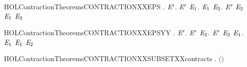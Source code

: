 \begin{SaveVerbatim}{HOLContractionTheoremsCONTRACTIONXXEPS}
\HOLTokenTurnstile{} \HOLSymConst{\HOLTokenForall{}}.
       \HOLSymConst{\HOLTokenImp{}}
     \HOLSymConst{\HOLTokenForall{}} \ensuremath{\HOLBoundVar{E}\sp{\prime{}}}.
         \ensuremath{\HOLBoundVar{E}\sp{\prime{}}} \HOLSymConst{\HOLTokenImp{}} \HOLSymConst{\HOLTokenForall{}}\ensuremath{\HOLBoundVar{E}\sb{\mathrm{1}}}.   \ensuremath{\HOLBoundVar{E}\sb{\mathrm{1}}} \HOLSymConst{\HOLTokenImp{}} \HOLSymConst{\HOLTokenExists{}}\ensuremath{\HOLBoundVar{E}\sb{\mathrm{2}}}.  \ensuremath{\HOLBoundVar{E}\sp{\prime{}}} \ensuremath{\HOLBoundVar{E}\sb{\mathrm{2}}} \HOLSymConst{\HOLTokenConj{}}  \ensuremath{\HOLBoundVar{E}\sb{\mathrm{1}}} \ensuremath{\HOLBoundVar{E}\sb{\mathrm{2}}}
\end{SaveVerbatim}
\newcommand{\HOLContractionTheoremsCONTRACTIONXXEPS}{\UseVerbatim{HOLContractionTheoremsCONTRACTIONXXEPS}}
\begin{SaveVerbatim}{HOLContractionTheoremsCONTRACTIONXXEPSYY}
\HOLTokenTurnstile{} \HOLSymConst{\HOLTokenForall{}}.
       \HOLSymConst{\HOLTokenImp{}}
     \HOLSymConst{\HOLTokenForall{}} \ensuremath{\HOLBoundVar{E}\sp{\prime{}}}.
         \ensuremath{\HOLBoundVar{E}\sp{\prime{}}} \HOLSymConst{\HOLTokenImp{}}
       \HOLSymConst{\HOLTokenForall{}} \ensuremath{\HOLBoundVar{E}\sb{\mathrm{2}}}.  \ensuremath{\HOLBoundVar{E}\sp{\prime{}}} \ensuremath{\HOLBoundVar{E}\sb{\mathrm{2}}} \HOLSymConst{\HOLTokenImp{}} \HOLSymConst{\HOLTokenExists{}}\ensuremath{\HOLBoundVar{E}\sb{\mathrm{1}}}.   \ensuremath{\HOLBoundVar{E}\sb{\mathrm{1}}} \HOLSymConst{\HOLTokenConj{}}  \ensuremath{\HOLBoundVar{E}\sb{\mathrm{1}}} \ensuremath{\HOLBoundVar{E}\sb{\mathrm{2}}}
\end{SaveVerbatim}
\newcommand{\HOLContractionTheoremsCONTRACTIONXXEPSYY}{\UseVerbatim{HOLContractionTheoremsCONTRACTIONXXEPSYY}}
\begin{SaveVerbatim}{HOLContractionTheoremsCONTRACTIONXXSUBSETXXcontracts}
\HOLTokenTurnstile{} \HOLSymConst{\HOLTokenForall{}}.   \HOLSymConst{\HOLTokenImp{}}   \ensuremath{(}\ensuremath{)}
\end{SaveVerbatim}
